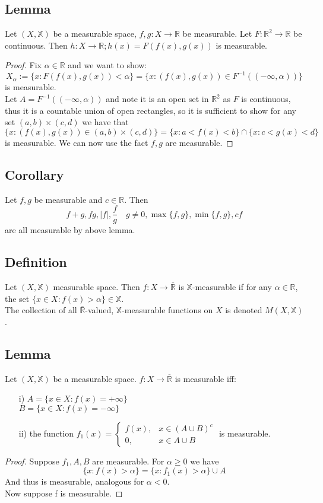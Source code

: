\documentclass[a4paper, 12pt, twoside]{article}
\begin{document}
\subsection{Lemma}
Let $(X,\mathbb{X})$ be a measurable space, $f,g:X\to \mathbb{R}$ be measurable. Let $F:\mathbb{R}^{2}\to \mathbb{R}$ be continuous. Then $h:X\to \mathbb{R}; h(x)=F(f(x),g(x))$ is measurable.
\begin{proof}
    Fix $\alpha \in \mathbb{R}$ and we want to show:
    $$X_{\alpha}:=\{x:F(f(x),g(x))<\alpha\}=\{x:(f(x),g(x))\in F^{-1}((-\infty,\alpha)) \}$$
    is measurable.\\
    Let $A=F^{-1}((-\infty,\alpha))$ and note it is an open set in $\mathbb{R}^{2}$ as $F$ is continuous, thus it is a countable union of open rectangles, so it is sufficient to show for any set $(a,b)\times(c,d)$ we have that
    $$\{x:(f(x),g(x))\in(a,b)\times(c,d)\}=\{x:a<f(x)<b\}\cap\{x:c<g(x)<d\} $$
    is measurable. We can now use the fact $f,g$ are measurable.
\end{proof}
\subsection{Corollary}
Let $f,g$ be measurable and $c\in \mathbb{R}$. Then
$$f+g,fg,|f|,\frac{f}{g}\quad g\neq0,\max\{f,g\},\min\{f,g\},cf$$
are all measurable by above lemma.
\subsection{Definition}
Let $(X,\mathbb{X})$ measurable space. Then $f:X \to  \overline{\mathbb{R}}$ is $\mathbb{X}$-measurable if for any $\alpha\in \mathbb{R}$, the set $\{x\in X:f(x)>\alpha\}\in \mathbb{X}$.\\
The collection of all $\overline{\mathbb{R}}$-valued, $\mathbb{X}$-measurable functions on $X$ is denoted $M(X,\mathbb{X})$.
\subsection{Lemma}
Let $(X,\mathbb{X})$ be a measurable space. $f:X\to \overline{\mathbb{R}}$ is measurable iff:
\begin{itemize}
    \item[i)] $A=\{x\in X:f(x)=+\infty\}$\\
    $B=\{x\in X:f(x)=-\infty\}$
    \item[ii)] the function $f_{1}(x)=
    \begin{cases}
      f(x), & x\in(A\cup B)^{c} \\
      0, & x\in A\cup B
   \end{cases}$ is measurable.
\end{itemize}
\begin{proof}
    Suppose $f_{1},A,B$ are measurable. For $\alpha\geq0$ we have
    $$\{x:f(x)>\alpha\}=\{x:f_{1}(x)>\alpha\}\cup A $$
    And thus is measurable, analogous for $\alpha<0$.\\
    Now suppose f is measurable. 
\end{proof}
\end{document}
